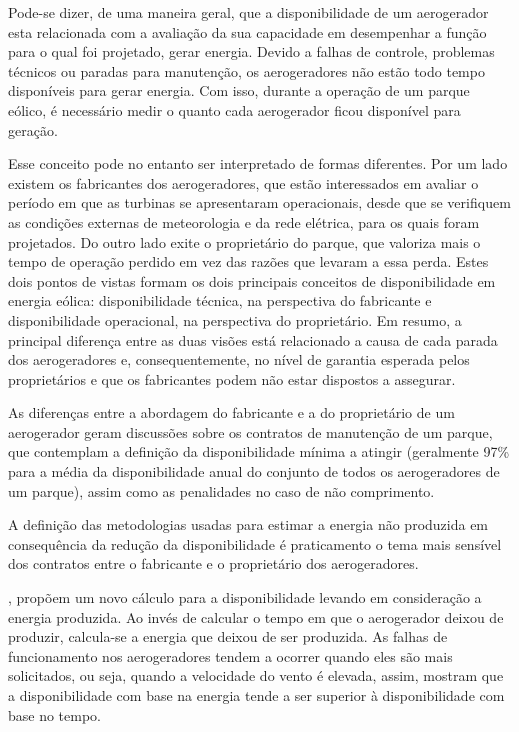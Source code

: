 Pode-se dizer, de uma maneira geral, que a disponibilidade de um aerogerador esta relacionada com a avaliação da sua capacidade em desempenhar a função para o qual foi projetado, gerar energia. Devido a falhas de controle, problemas técnicos ou paradas para manutenção, os aerogeradores não estão todo tempo disponíveis para gerar energia. Com isso, durante a operação de um parque eólico, é necessário medir o quanto cada aerogerador ficou disponível para geração.

Esse conceito pode no entanto ser interpretado de formas diferentes. Por um lado existem os fabricantes dos aerogeradores, que estão interessados em avaliar o período em que as turbinas se apresentaram operacionais, desde que se verifiquem as condições externas de meteorologia e da rede elétrica, para os quais foram projetados. Do outro lado exite o proprietário do parque, que valoriza mais o tempo de operação perdido em vez das razões que levaram a essa perda. Estes dois pontos de vistas formam os dois principais conceitos de disponibilidade em energia eólica: disponibilidade técnica, na perspectiva do fabricante e disponibilidade operacional, na perspectiva do proprietário. Em resumo, a principal diferença entre as duas visões está relacionado a causa de cada parada dos aerogeradores e, consequentemente, no nível de garantia esperada pelos proprietários e que os fabricantes podem não estar dispostos a assegurar.

As diferenças entre a abordagem do fabricante e a do proprietário de um aerogerador geram discussões sobre os contratos de manutenção de um parque, que contemplam a definição da disponibilidade mínima a atingir (geralmente 97\% para a média da disponibilidade anual do conjunto de todos os aerogeradores de um parque), assim como as penalidades no caso de não comprimento.

A definição das metodologias usadas para estimar a energia não produzida em consequência da redução da disponibilidade é praticamento o tema mais sensível dos contratos entre o fabricante e o proprietário dos aerogeradores.

, propõem um novo cálculo para a disponibilidade levando em consideração a energia produzida. Ao invés de calcular o tempo em que o aerogerador deixou de produzir, calcula-se a energia que deixou de ser produzida. As falhas de funcionamento nos aerogeradores tendem a ocorrer quando eles são mais solicitados, ou seja, quando a velocidade do vento é elevada, assim,  mostram que a disponibilidade com base na energia tende a ser superior à disponibilidade com base no tempo.

